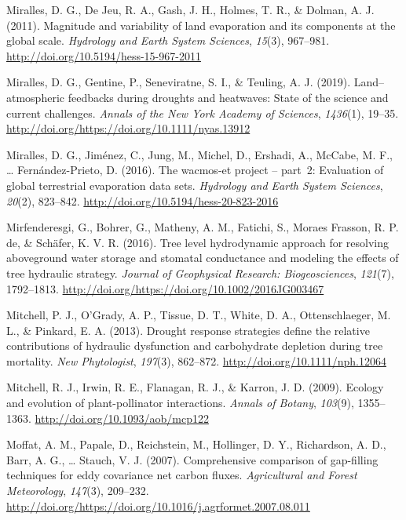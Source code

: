 \documentclass[11pt,twoside]{reedthesis}
\begin{document}
\hypertarget{ref-Miralles2011}{}
Miralles, D. G., De Jeu, R. A., Gash, J. H., Holmes, T. R., \& Dolman,
A. J. (2011). Magnitude and variability of land evaporation and its
components at the global scale. \emph{Hydrology and Earth System
Sciences}, \emph{15}(3), 967--981.
\url{http://doi.org/10.5194/hess-15-967-2011}

\hypertarget{ref-Miralles2019}{}
Miralles, D. G., Gentine, P., Seneviratne, S. I., \& Teuling, A. J.
(2019). Land--atmospheric feedbacks during droughts and heatwaves: State
of the science and current challenges. \emph{Annals of the New York
Academy of Sciences}, \emph{1436}(1), 19--35.
\url{http://doi.org/https://doi.org/10.1111/nyas.13912}

\hypertarget{ref-Miralles2016}{}
Miralles, D. G., Jiménez, C., Jung, M., Michel, D., Ershadi, A., McCabe,
M. F., \ldots{} Fernández-Prieto, D. (2016). The wacmos-et project --
part~2: Evaluation of global terrestrial evaporation data sets.
\emph{Hydrology and Earth System Sciences}, \emph{20}(2), 823--842.
\url{http://doi.org/10.5194/hess-20-823-2016}

\hypertarget{ref-Mirfenderesgi2016}{}
Mirfenderesgi, G., Bohrer, G., Matheny, A. M., Fatichi, S., Moraes
Frasson, R. P. de, \& Schäfer, K. V. R. (2016). Tree level hydrodynamic
approach for resolving aboveground water storage and stomatal
conductance and modeling the effects of tree hydraulic strategy.
\emph{Journal of Geophysical Research: Biogeosciences}, \emph{121}(7),
1792--1813. \url{http://doi.org/https://doi.org/10.1002/2016JG003467}

\hypertarget{ref-mitchell_drought_2013}{}
Mitchell, P. J., O'Grady, A. P., Tissue, D. T., White, D. A.,
Ottenschlaeger, M. L., \& Pinkard, E. A. (2013). Drought response
strategies define the relative contributions of hydraulic dysfunction
and carbohydrate depletion during tree mortality. \emph{New
Phytologist}, \emph{197}(3), 862--872.
\url{http://doi.org/10.1111/nph.12064}

\hypertarget{ref-Mitchell2009}{}
Mitchell, R. J., Irwin, R. E., Flanagan, R. J., \& Karron, J. D. (2009).
Ecology and evolution of plant-pollinator interactions. \emph{Annals of
Botany}, \emph{103}(9), 1355--1363.
\url{http://doi.org/10.1093/aob/mcp122}

\hypertarget{ref-Moffat2007}{}
Moffat, A. M., Papale, D., Reichstein, M., Hollinger, D. Y., Richardson,
A. D., Barr, A. G., \ldots{} Stauch, V. J. (2007). Comprehensive
comparison of gap-filling techniques for eddy covariance net carbon
fluxes. \emph{Agricultural and Forest Meteorology}, \emph{147}(3),
209--232.
\url{http://doi.org/https://doi.org/10.1016/j.agrformet.2007.08.011}
\end{document}
